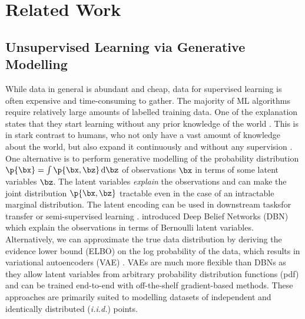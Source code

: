 \section{Related Work}
\label{sec:lit}



%
%   
    \subsection{Unsupervised Learning via Generative Modelling}
       While data in general is abundant and cheap, data for supervised learning is often expensive and time-consuming to gather. The majority of ML algorithms require relatively large amounts of labelled training data. One of the explanation states that they start learning without any prior knowledge of the world \addref. This is in stark contrast to humans, who not only have a vast amount of knowledge about the world, but also expand it continuously and without any supervision \citep{Friston2009guide}. One alternative is to perform generative modelling of the probability distribution $\p{\bx} = \int \p{\bx, \bz} \dint \bz$ of observations $\bx$ in terms of some latent variables $\bz$. The latent variables \emph{explain} the observations and can make the joint distribution $\p{\bx, \bz}$ tractable even in the case of an intractable marginal distribution. The latent encoding can be used in downstream tasks\eg for transfer or semi-supervised learning \citep{Pan2010}. \cite{Hinton2006dbn} introduced Deep Belief Networks (DBN) which explain the observations in terms of Bernoulli latent variables. Alternatively, we can approximate the true data distribution by deriving the evidence lower bound (ELBO) on the log probability of the data, which results in variational autoencoders (VAE) \citep{Kingma2014,Rezende2014}. VAEs are much more flexible than DBNs as they allow latent variables from arbitrary probability distribution functions (pdf) and can be trained end-to-end with off-the-shelf gradient-based methods. These approaches are primarily suited to modelling datasets of independent and identically distributed (\emph{i.i.d.}) points.
%
%
